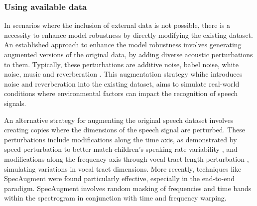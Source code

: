 \subsubsection{Using available data}
In scenarios where the inclusion of external data is not possible, there is a necessity to enhance model robustness by directly modifying the existing dataset. An established approach to enhance the model robustness involves generating augmented versions of the original data, by adding diverse acoustic perturbations to them. Typically, these perturbations are additive noise, babel noise, white noise, music and reverberation \cite{liu2003noise,whitenoise,gelin2020babble,couvreur2000use,malek2017robust}. This augmentation strategy whihc introduces noise and reverberation into the existing dataset, aims to simulate real-world conditions where environmental factors can impact the recognition of speech signals.

An alternative strategy for augmenting the original speech dataset involves creating copies where the dimensions of the speech signal are perturbed. These perturbations include modifications along the time axis, as demonstrated by speed perturbation to better match children's speaking rate variability \cite{lo2020ntnu}, and modifications along the frequency axis \cite{singh2022spectral} through vocal tract length perturbation \cite{VTLP}, simulating variations in vocal tract dimensions. More recently, techniques like SpecAugment \cite{specaugment} were found particularly effective, especially in the end-to-end paradigm. SpecAugment involves random masking of frequencies and time bands within the spectrogram in conjunction with time and frequency warping.


